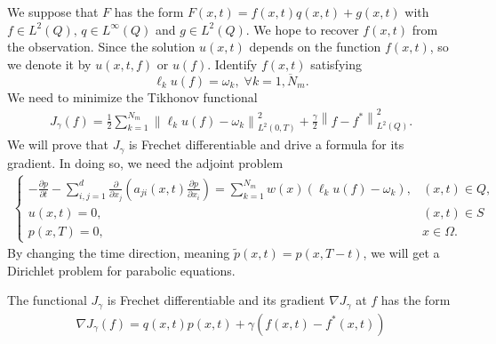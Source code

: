 \documentclass[]{article}
\begin{document}
We suppose that $F$ has the form $F(x, t)=f(x, t)q(x, t)+g(x, t)$ with \color{red} $f\in L^2(Q),\, q\in L^\infty(Q)$ and $g\in L^2(Q)$\color{black}. We hope to recover $f(x, t)$ from the observation. Since the solution $u(x, t)$ depends on the function $f(x, t)$, so we denote it by $u(x, t, f)$ or $u(f)$. Identify $f(x, t)$ satisfying 
$$\ell_k u(f)=\omega_k,\; \forall k = \overline{1, N_m}.$$
We need to minimize the Tikhonov functional
\begin{align}\label{2.4}
	J_{\gamma}(f)=\frac{1}{2}\sum_{k=1}^{N_m}\left\|\ell_k u(f)-\omega_k\right\|_{L^2(0, T)}^2+\frac{\gamma}{2}\left\|f-f^*\right\|_{L^2(Q)}^2.
\end{align}
We will prove that $J_\gamma$ is Frechet differentiable and drive a formula for its gradient. In doing so, we need the adjoint problem
\begin{align}\label{2.5} 
	\begin{cases}
		-\frac{\partial p}{\partial t}-\sum_{i, j=1}^{d}\frac{\partial}{\partial x_j}\left(a_{ji}(x, t)\frac{\partial p}{\partial x_i}\right)=\sum_{k=1}^{N_m}w(x)\left(\ell_k u(f)-\omega_k\right), & (x, t)\in Q,\\
		u(x, t)=0, & (x, t)\in S\\
		p(x, T)=0, & x\in \Omega.
	\end{cases}
\end{align}
By changing the time direction, meaning $\tilde{p}(x, t)=p(x, T-t)$, we will get a Dirichlet problem for parabolic equations.
\begin{dl}
	The functional $J_\gamma$ is Frechet differentiable and its gradient $\nabla J_\gamma$ at $f$ has the form 
	\begin{align}\label{2.6}
		\nabla J_\gamma(f)=q(x, t)p(x, t)+\gamma \left(f(x, t)-f^*(x, t)\right)
	\end{align}
\end{dl}
\end{document}

